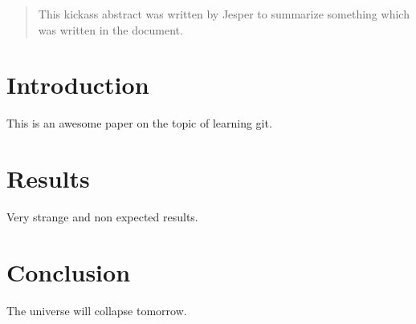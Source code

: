\documentclass{article}
\begin{document}
\begin{abstract}
This kickass abstract was written by Jesper to summarize something which was written in the document.
\end{abstract}

\section{Introduction}

This is an awesome paper on the topic of learning git.

\section{Results}

Very strange and non expected results.  

\section{Conclusion}

The universe will collapse tomorrow.
\end{document}
